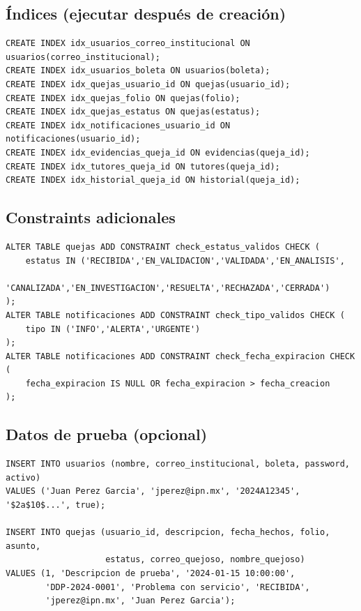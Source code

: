 \documentclass[11pt,letterpaper]{article}
\begin{document}
\subsection{Índices (ejecutar después de creación)}
\begin{lstlisting}
CREATE INDEX idx_usuarios_correo_institucional ON usuarios(correo_institucional);
CREATE INDEX idx_usuarios_boleta ON usuarios(boleta);
CREATE INDEX idx_quejas_usuario_id ON quejas(usuario_id);
CREATE INDEX idx_quejas_folio ON quejas(folio);
CREATE INDEX idx_quejas_estatus ON quejas(estatus);
CREATE INDEX idx_notificaciones_usuario_id ON notificaciones(usuario_id);
CREATE INDEX idx_evidencias_queja_id ON evidencias(queja_id);
CREATE INDEX idx_tutores_queja_id ON tutores(queja_id);
CREATE INDEX idx_historial_queja_id ON historial(queja_id);
\end{lstlisting}

\subsection{Constraints adicionales}
\begin{lstlisting}
ALTER TABLE quejas ADD CONSTRAINT check_estatus_validos CHECK (
    estatus IN ('RECIBIDA','EN_VALIDACION','VALIDADA','EN_ANALISIS',
                'CANALIZADA','EN_INVESTIGACION','RESUELTA','RECHAZADA','CERRADA')
);
ALTER TABLE notificaciones ADD CONSTRAINT check_tipo_validos CHECK (
    tipo IN ('INFO','ALERTA','URGENTE')
);
ALTER TABLE notificaciones ADD CONSTRAINT check_fecha_expiracion CHECK (
    fecha_expiracion IS NULL OR fecha_expiracion > fecha_creacion
);
\end{lstlisting}

\subsection{Datos de prueba (opcional)}
\begin{lstlisting}
INSERT INTO usuarios (nombre, correo_institucional, boleta, password, activo)
VALUES ('Juan Perez Garcia', 'jperez@ipn.mx', '2024A12345', '$2a$10$...', true);

INSERT INTO quejas (usuario_id, descripcion, fecha_hechos, folio, asunto, 
                    estatus, correo_quejoso, nombre_quejoso)
VALUES (1, 'Descripcion de prueba', '2024-01-15 10:00:00', 
        'DDP-2024-0001', 'Problema con servicio', 'RECIBIDA', 
        'jperez@ipn.mx', 'Juan Perez Garcia');
\end{lstlisting}
\end{document}
